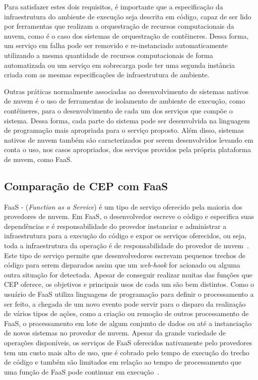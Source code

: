 Para satisfazer estes dois requisitos, é importante que a especificação da infraestrutura do ambiente de execução seja descrita em código, capaz de ser lido por ferramentas que realizam a orquestração de recursos computacionais da nuvem, como é o caso dos sistemas de orquestração de contêineres. Dessa forma, um serviço em falha pode ser removido e re-instanciado automaticamente utilizando a mesma quantidade de recursos computacionais de forma automatizada ou um serviço em sobrecarga pode ter uma segunda instância criada com as mesmas especificações de infraestrutura de ambiente. 

Outras práticas normalmente associadas ao desenvolvimento de sistemas nativos de nuvem é o uso de ferramentas de isolamento de ambiente de execução, como contêineres, para o desenvolvimento de cada um dos serviços que compõe o sistema. Dessa forma, cada parte do sistema pode ser desenvolvida na linguagem de programação mais apropriada para o serviço proposto. Além disso, sistemas nativos de nuvem também são caracterizados por serem desenvolvidos levando em conta o uso, nos casos apropriados, dos serviços providos pela própria plataforma de nuvem, como FaaS.

\subsection{Comparação de CEP com FaaS}
\label{sub-sec:Faas}
FaaS - (\textit{Function as a Service}) é um tipo de serviço oferecido pela maioria dos provedores de nuvem. Em FaaS, o desenvolvedor escreve o código e especifica suas dependências e é responsabilidade do provedor instanciar e administrar a infraestrutura para a execução do código e expor os serviços oferecidos, ou seja, toda a infraestrutura da operação é de responsabilidade do provedor de nuvem~\citep{garrison2017cloud}. Este tipo de serviço permite que desenvolvedores escrevam pequenos trechos de código para serem disparados assim que um \textit{web-hook} for acionado ou alguma outra situação for detectada. Apesar de conseguir realizar muitas das funções que CEP oferece, os objetivos e principais usos de cada um são bem distintos. Como o usuário de FaaS utiliza linguagens de programação para definir o processamento a ser feito, a chegada de um novo evento pode servir para o disparo da realização de vários tipos de ações, como a criação ou remoção de outros processamento de FaaS, o processamento em lote de algum conjunto de dados ou até a instanciação de novos sistemas no provedor de nuvem. Apesar da grande variedade de operações disponíveis, os serviços de FaaS oferecidos nativamente pelo provedores tem um custo mais alto de uso, que é cobrado pelo tempo de execução do trecho de código e também são limitados em relação ao tempo de processamento que uma função de FaaS pode continuar em execução~\citep{AWSLambda,AzureCloudServices,GoogleAppEngine}.

